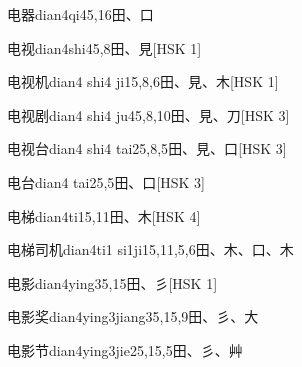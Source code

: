 \begin{entry}{电器}{dian4qi4}{5,16}{⽥、⼝}
\end{entry}

\begin{entry}{电视}{dian4shi4}{5,8}{⽥、⾒}[HSK 1]
\end{entry}

\begin{entry}{电视机}{dian4 shi4 ji1}{5,8,6}{⽥、⾒、⽊}[HSK 1]
\end{entry}

\begin{entry}{电视剧}{dian4 shi4 ju4}{5,8,10}{⽥、⾒、⼑}[HSK 3]
\end{entry}

\begin{entry}{电视台}{dian4 shi4 tai2}{5,8,5}{⽥、⾒、⼝}[HSK 3]
\end{entry}

\begin{entry}{电台}{dian4 tai2}{5,5}{⽥、⼝}[HSK 3]
\end{entry}

\begin{entry}{电梯}{dian4ti1}{5,11}{⽥、⽊}[HSK 4]
\end{entry}

\begin{entry}{电梯司机}{dian4ti1 si1ji1}{5,11,5,6}{⽥、⽊、⼝、⽊}
\end{entry}

\begin{entry}{电影}{dian4ying3}{5,15}{⽥、⼺}[HSK 1]
\end{entry}

\begin{entry}{电影奖}{dian4ying3jiang3}{5,15,9}{⽥、⼺、⼤}
\end{entry}

\begin{entry}{电影节}{dian4ying3jie2}{5,15,5}{⽥、⼺、⾋}
\end{entry}

